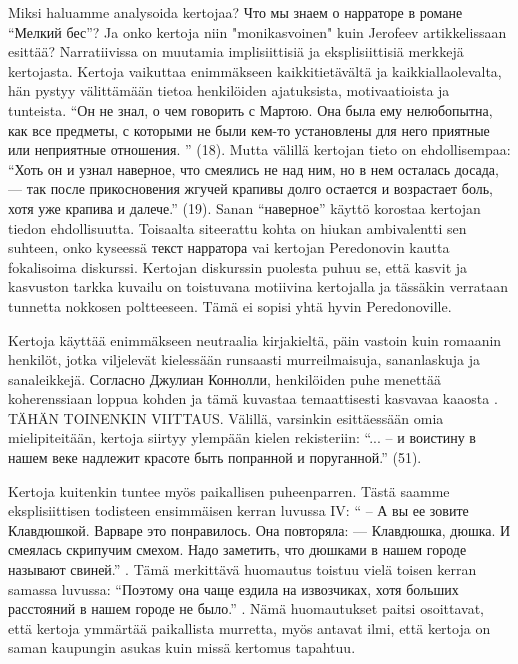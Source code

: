 \documentclass[12pt,a4paper]{article}
\begin{document}
Miksi haluamme analysoida kertojaa? 
Что мы знаем о нарраторе в романе \enquote{Мелкий бес}? Ja onko kertoja niin "monikasvoinen" kuin Jerofeev artikkelissaan esittää? Narratiivissa on muutamia implisiittisiä ja eksplisiittisiä merkkejä kertojasta. Kertoja vaikuttaa enimmäkseen kaikkitietävältä ja kaikkiallaolevalta, hän pystyy välittämään tietoa henkilöiden ajatuksista, motivaatioista ja tunteista. \enquote{Он не знал, о чем говорить с Мартою. Она была ему нелюбопытна,
как все предметы, с которыми не были кем-то установлены для него
приятные или неприятные отношения.
} (18). Mutta välillä kertojan tieto on ehdollisempaa: \enquote{Хоть он и узнал наверное, что смеялись не над ним, но в нем осталась досада, — так после прикосновения жгучей крапивы долго остается и  возрастает боль, хотя уже крапива и далече.} (19). Sanan \enquote{наверное} käyttö korostaa kertojan tiedon ehdollisuutta. Toisaalta siteerattu kohta on hiukan ambivalentti sen suhteen, onko kyseessä текст нарратора vai kertojan Peredonovin kautta fokalisoima diskurssi. Kertojan diskurssin puolesta puhuu se, että kasvit ja kasvuston tarkka kuvailu on toistuvana motiivina kertojalla ja tässäkin verrataan tunnetta nokkosen poltteeseen. Tämä ei sopisi yhtä hyvin Peredonoville. 

Kertoja käyttää enimmäkseen neutraalia kirjakieltä, päin vastoin kuin romaanin henkilöt, jotka viljelevät kielessään runsaasti murreilmaisuja, sananlaskuja ja sanaleikkejä. Согласно Джулиан Коннолли, henkilöiden puhe menettää koherenssiaan loppua kohden ja tämä kuvastaa temaattisesti kasvavaa kaaosta \parencite[358--359]{connolly1981}. TÄHÄN TOINENKIN VIITTAUS. Välillä, varsinkin esittäessään omia mielipiteitään, kertoja siirtyy ylempään kielen rekisteriin: \enquote{... – и воистину в нашем веке надлежит красоте быть попранной и поруганной.} (51).

Kertoja kuitenkin tuntee myös paikallisen puheenparren. Tästä saamme eksplisiittisen todisteen ensimmäisen kerran luvussa IV: \enquote{ – А вы ее зовите Клавдюшкой.
Варваре это понравилось. Она повторяла:
— Клавдюшка, дюшка.
И смеялась скрипучим смехом. Надо заметить, что дюшками в 
нашем городе называют свиней.} \parencite[33]{sologub2004}. Tämä merkittävä huomautus toistuu vielä toisen kerran samassa luvussa: \enquote{Поэтому она чаще ездила на извозчиках,
хотя больших расстояний в нашем городе не было.} \parencite[34]{sologub2004}. Nämä huomautukset paitsi osoittavat, että kertoja ymmärtää paikallista murretta, myös antavat ilmi, että kertoja on saman kaupungin asukas kuin missä kertomus tapahtuu.
\end{document}
